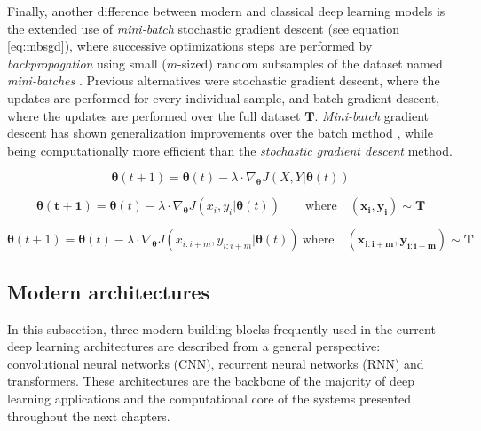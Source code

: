 Finally, another difference between modern and classical deep learning models is the extended use of \textit{mini-batch} stochastic gradient descent (see equation \ref{eq:mbsgd}), where successive optimizations steps are performed by \textit{backpropagation} using small ($m$-sized) random subsamples of the dataset named \textit{mini-batches} \autocite{ruder2016}. Previous alternatives were stochastic gradient descent, where the updates are performed for every individual sample, and batch gradient descent, where the updates are performed over the full dataset $\mathbf{T}$. \textit{Mini-batch} gradient descent has shown generalization improvements over the batch method \autocite{Hoffer2017}, while being computationally more efficient than the \textit{stochastic gradient descent} method.


\begin{equation}
	\label{eq:bgd}
	\mathbf{\theta}(t+1) = \mathbf{\theta}(t) - \lambda \cdot \nabla_\mathbf{\theta} J(X, Y|\mathbf{\theta}(t))
\end{equation}

\begin{equation}
	\label{eq:sgd}
	\mathbf{\theta(t+1)} = \mathbf{\theta}(t) - \lambda \cdot \nabla_\mathbf{\theta} J(x_i, y_i|\mathbf{\theta}(t)) \quad \mathrm \quad \mathrm{where} \quad (\mathbf{x_i}, \mathbf{y_i}) \sim \mathbf{T}
\end{equation}

\begin{equation}
	\label{eq:mbsgd}
	\mathbf{\theta}(t+1) = \mathbf{\theta}(t) - \lambda \cdot \nabla_\mathbf{\theta} J(x_{i:i+m}, y_{i:i+m}|\mathbf{\theta}(t)) \  \mathrm{where} \quad  (\mathbf{x_{i:i+m}}, \mathbf{y_{i:i+m}}) \sim \mathbf{T}
\end{equation}


\subsection{Modern architectures}
In this subsection, three modern building blocks frequently used in the current deep learning architectures are described from a general perspective: convolutional neural networks (CNN), recurrent neural networks (RNN) and transformers. These architectures are the backbone of the majority of deep learning applications and the computational core of the systems presented throughout the next chapters.

